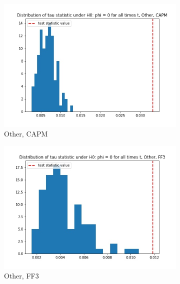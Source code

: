 \documentclass{article}
\begin{document}
  \begin{figure}
  \centering
  \begin{subfigure}[b]{0.3\textwidth}
    \centering
    \includegraphics[width=\textwidth]{Other/tau_hist_02_CAPM.jpg}
    \caption{Other, CAPM}
    \label{fig:1}
  \end{subfigure}
  \begin{subfigure}[b]{0.3\textwidth}
    \centering
    \includegraphics[width=\textwidth]{Other/tau_hist_02_FF3.jpg}
    \caption{Other, FF3}
    \label{fig:2}
  \end{subfigure}
    \begin{subfigure}[b]{0.3\textwidth}
    \centering

\end{subfigure}
\end{figure}
\end{document}
